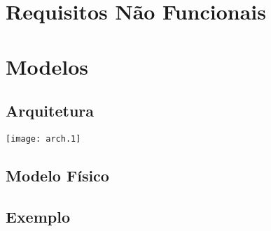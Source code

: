 \documentclass[a4paper,12pt]{article}
\begin{document}
\section{Requisitos Não Funcionais}

\section{Modelos}
\subsection{Arquitetura}
\texttt{[image: arch.1]}

\subsection{Modelo Físico}
\ifpdf
\else
\fi

\subsection{Exemplo}
\ifpdf
\else
\fi
\end{document}
